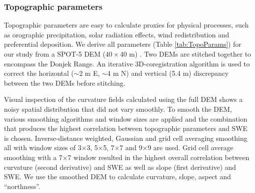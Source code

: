 \documentclass[review,oneside, letterpaper]{igs}
\begin{document}
\subsubsection{Topographic parameters}

Topographic parameters are easy to calculate proxies for physical processes, such as orographic precipitation, solar radiation effects, wind redistribution and preferential deposition. We derive all parameters (Table \ref{tab:TopoParams}) for our study from a SPOT-5 DEM ($40\times40$ m) \citep{Korona2009}. Two DEMs are stitched together to encompass the Donjek Range. An iterative 3D-coregistration algorithm \citep{Berthier2007} is used to correct the horizontal ($\sim$2 m E, $\sim$4 m N) and vertical (5.4 m) discrepancy between the two DEMs before stitching. 

Visual inspection of the curvature fields calculated using the full DEM shows a noisy spatial distribution that did not vary smoothly. To smooth the DEM, various smoothing algorithms and window sizes are applied and the combination that produces the highest correlation between topographic parameters and SWE is chosen. Inverse-distance weighted, Gaussian and grid cell averaging smoothing all with window sizes of 3$\times$3, 5$\times$5, 7$\times$7 and 9$\times$9 are used. Grid cell average smoothing with a 7$\times$7 window resulted in the highest overall correlation between curvature (second derivative) and SWE as well as slope (first derivative) and SWE. We use the smoothed DEM to calculate curvature, slope, aspect and ``northness''.
\end{document}

